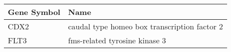 \begin{tabular}{ll}
\toprule
Gene Symbol &                                         Name \\
\midrule
       CDX2 & caudal type homeo box transcription factor 2 \\
       FLT3 &                fms-related tyrosine kinase 3 \\
\bottomrule
\end{tabular}
